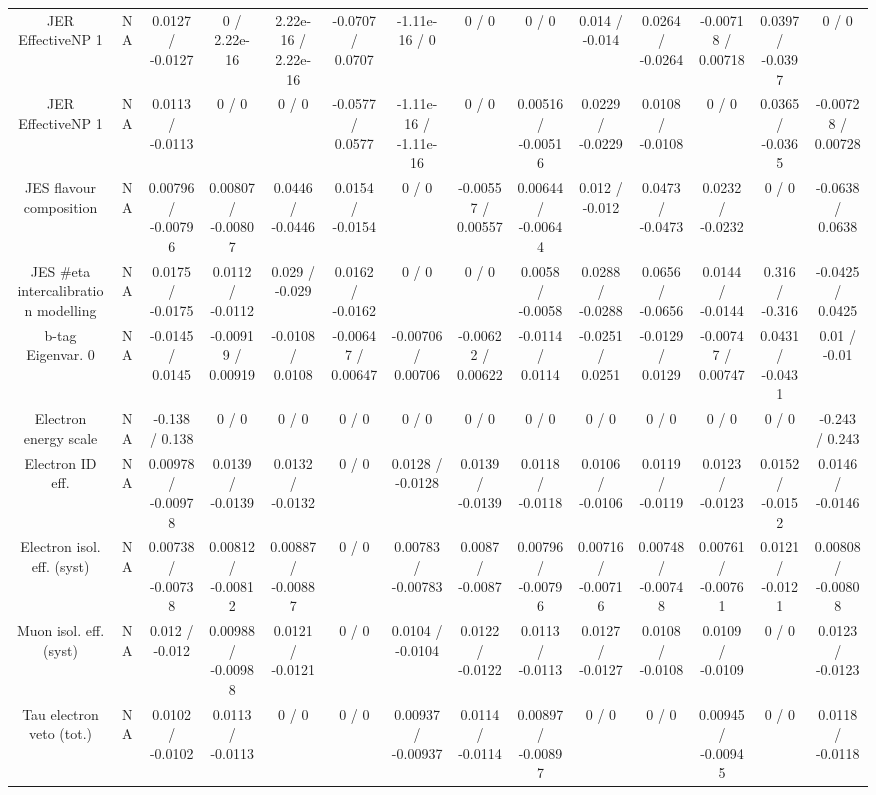 \documentclass[10pt]{article}
\begin{document}
\begin{table}[htbp]
\begin{center}
\begin{tabular}{|c|c|c|c|c|c|c|c|c|c|c|c|c|c|}
  JER EffectiveNP 1 &    NA    & 0.0127 / -0.0127 & 0 / 2.22e-16 & 2.22e-16 / 2.22e-16 & -0.0707 / 0.0707 & -1.11e-16 / 0 & 0 / 0 & 0 / 0 & 0.014 / -0.014 & 0.0264 / -0.0264 & -0.00718 / 0.00718 & 0.0397 / -0.0397 & 0 / 0 \\ 
  JER EffectiveNP 1 &    NA    & 0.0113 / -0.0113 & 0 / 0 & 0 / 0 & -0.0577 / 0.0577 & -1.11e-16 / -1.11e-16 & 0 / 0 & 0.00516 / -0.00516 & 0.0229 / -0.0229 & 0.0108 / -0.0108 & 0 / 0 & 0.0365 / -0.0365 & -0.00728 / 0.00728 \\ 
  JES flavour composition &    NA    & 0.00796 / -0.00796 & 0.00807 / -0.00807 & 0.0446 / -0.0446 & 0.0154 / -0.0154 & 0 / 0 & -0.00557 / 0.00557 & 0.00644 / -0.00644 & 0.012 / -0.012 & 0.0473 / -0.0473 & 0.0232 / -0.0232 & 0 / 0 & -0.0638 / 0.0638 \\ 
  JES #eta intercalibration modelling &    NA    & 0.0175 / -0.0175 & 0.0112 / -0.0112 & 0.029 / -0.029 & 0.0162 / -0.0162 & 0 / 0 & 0 / 0 & 0.0058 / -0.0058 & 0.0288 / -0.0288 & 0.0656 / -0.0656 & 0.0144 / -0.0144 & 0.316 / -0.316 & -0.0425 / 0.0425 \\ 
  b-tag Eigenvar. 0 &    NA    & -0.0145 / 0.0145 & -0.00919 / 0.00919 & -0.0108 / 0.0108 & -0.00647 / 0.00647 & -0.00706 / 0.00706 & -0.00622 / 0.00622 & -0.0114 / 0.0114 & -0.0251 / 0.0251 & -0.0129 / 0.0129 & -0.00747 / 0.00747 & 0.0431 / -0.0431 & 0.01 / -0.01 \\ 
  Electron energy scale &    NA    & -0.138 / 0.138 & 0 / 0 & 0 / 0 & 0 / 0 & 0 / 0 & 0 / 0 & 0 / 0 & 0 / 0 & 0 / 0 & 0 / 0 & 0 / 0 & -0.243 / 0.243 \\ 
  Electron ID eff. &    NA    & 0.00978 / -0.00978 & 0.0139 / -0.0139 & 0.0132 / -0.0132 & 0 / 0 & 0.0128 / -0.0128 & 0.0139 / -0.0139 & 0.0118 / -0.0118 & 0.0106 / -0.0106 & 0.0119 / -0.0119 & 0.0123 / -0.0123 & 0.0152 / -0.0152 & 0.0146 / -0.0146 \\ 
  Electron isol. eff. (syst) &    NA    & 0.00738 / -0.00738 & 0.00812 / -0.00812 & 0.00887 / -0.00887 & 0 / 0 & 0.00783 / -0.00783 & 0.0087 / -0.0087 & 0.00796 / -0.00796 & 0.00716 / -0.00716 & 0.00748 / -0.00748 & 0.00761 / -0.00761 & 0.0121 / -0.0121 & 0.00808 / -0.00808 \\ 
  Muon isol. eff. (syst) &    NA    & 0.012 / -0.012 & 0.00988 / -0.00988 & 0.0121 / -0.0121 & 0 / 0 & 0.0104 / -0.0104 & 0.0122 / -0.0122 & 0.0113 / -0.0113 & 0.0127 / -0.0127 & 0.0108 / -0.0108 & 0.0109 / -0.0109 & 0 / 0 & 0.0123 / -0.0123 \\ 
  Tau electron veto (tot.) &    NA    & 0.0102 / -0.0102 & 0.0113 / -0.0113 & 0 / 0 & 0 / 0 & 0.00937 / -0.00937 & 0.0114 / -0.0114 & 0.00897 / -0.00897 & 0 / 0 & 0 / 0 & 0.00945 / -0.00945 & 0 / 0 & 0.0118 / -0.0118 \\ 

\end{tabular}
\end{center}
\end{table}
\end{document}
